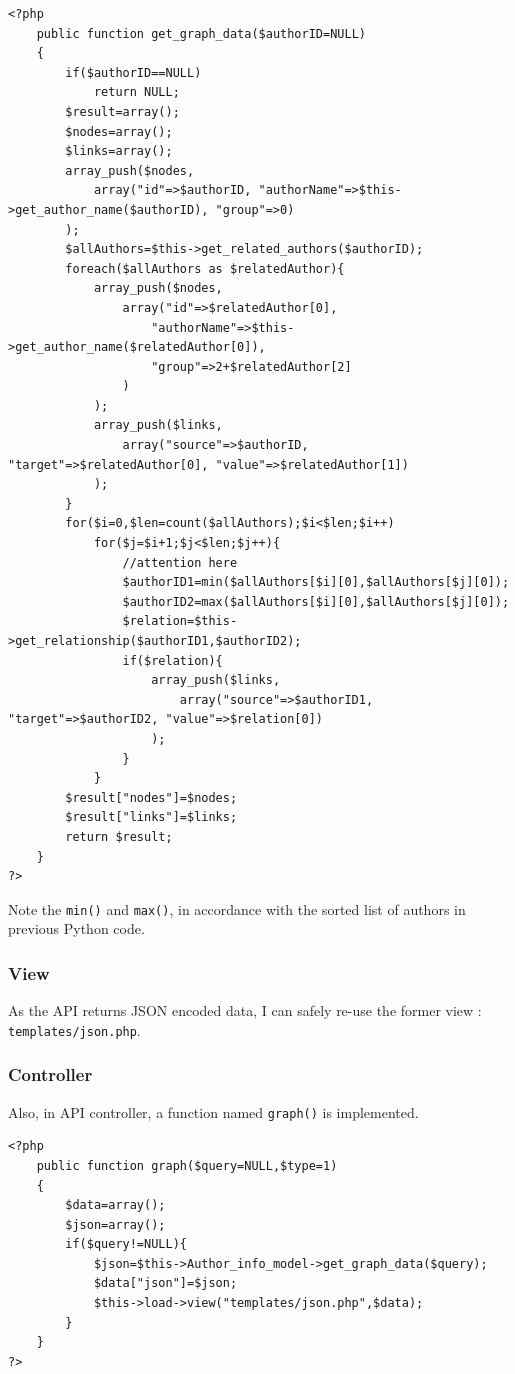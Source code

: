 \documentclass[a4paper]{article}
\begin{document}
\begin{verbatim}
<?php
    public function get_graph_data($authorID=NULL)
    {
        if($authorID==NULL)
            return NULL;
        $result=array();
        $nodes=array();
        $links=array();
        array_push($nodes, 
            array("id"=>$authorID, "authorName"=>$this->get_author_name($authorID), "group"=>0)
        );
        $allAuthors=$this->get_related_authors($authorID);
        foreach($allAuthors as $relatedAuthor){
            array_push($nodes, 
                array("id"=>$relatedAuthor[0],
                    "authorName"=>$this->get_author_name($relatedAuthor[0]),
                    "group"=>2+$relatedAuthor[2]
                )
            );
            array_push($links,
                array("source"=>$authorID, "target"=>$relatedAuthor[0], "value"=>$relatedAuthor[1])
            );
        }
        for($i=0,$len=count($allAuthors);$i<$len;$i++)
            for($j=$i+1;$j<$len;$j++){
                //attention here
                $authorID1=min($allAuthors[$i][0],$allAuthors[$j][0]);  
                $authorID2=max($allAuthors[$i][0],$allAuthors[$j][0]); 
                $relation=$this->get_relationship($authorID1,$authorID2);
                if($relation){
                    array_push($links,
                        array("source"=>$authorID1, "target"=>$authorID2, "value"=>$relation[0])
                    );
                }
            }
        $result["nodes"]=$nodes;
        $result["links"]=$links;
        return $result;
    }
?>
\end{verbatim}
Note the \texttt{min()} and \texttt{max()}, in accordance with the sorted list of authors in previous Python code.
            \subsubsection{View}
As the API returns JSON encoded data, I can safely re-use the former view : \texttt{templates/json.php}.
            \subsubsection{Controller}
Also, in API controller, a function named \texttt{graph()} is implemented. 
\begin{verbatim}
<?php
    public function graph($query=NULL,$type=1)
    {
        $data=array();
        $json=array();
        if($query!=NULL){
            $json=$this->Author_info_model->get_graph_data($query);
            $data["json"]=$json;
            $this->load->view("templates/json.php",$data);
        }
    }
?>
\end{verbatim}
\end{document}

